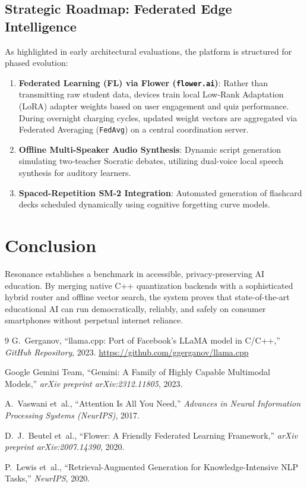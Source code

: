 \documentclass[10.5pt,a4paper]{article}
\begin{document}
\subsection{Strategic Roadmap: Federated Edge Intelligence}
As highlighted in early architectural evaluations, the platform is structured for phased evolution:
\begin{enumerate}[leftmargin=*,itemsep=0.5pt,topsep=1pt]
  \item \textbf{Federated Learning (FL) via Flower (\texttt{flower.ai})}: Rather than transmitting raw student data, devices train local Low-Rank Adaptation (LoRA) adapter weights based on user engagement and quiz performance. During overnight charging cycles, updated weight vectors are aggregated via Federated Averaging (\texttt{FedAvg}) on a central coordination server.
  \item \textbf{Offline Multi-Speaker Audio Synthesis}: Dynamic script generation simulating two-teacher Socratic debates, utilizing dual-voice local speech synthesis for auditory learners.
  \item \textbf{Spaced-Repetition SM-2 Integration}: Automated generation of flashcard decks scheduled dynamically using cognitive forgetting curve models.
\end{enumerate}

\section{Conclusion}
Resonance establishes a benchmark in accessible, privacy-preserving AI education. By merging native C++ quantization backends with a sophisticated hybrid router and offline vector search, the system proves that state-of-the-art educational AI can run democratically, reliably, and safely on consumer smartphones without perpetual internet reliance.

\vspace{0.2cm}

\begin{thebibliography}{9}
\scriptsize
{}
G.~Gerganov, ``llama.cpp: Port of Facebook's LLaMA model in C/C++,'' \textit{GitHub Repository}, 2023. \url{https://github.com/ggerganov/llama.cpp}

Google Gemini Team, ``Gemini: A Family of Highly Capable Multimodal Models,'' \textit{arXiv preprint arXiv:2312.11805}, 2023.

A.~Vaswani et~al., ``Attention Is All You Need,'' \textit{Advances in Neural Information Processing Systems (NeurIPS)}, 2017.

D.~J.~Beutel et~al., ``Flower: A Friendly Federated Learning Framework,'' \textit{arXiv preprint arXiv:2007.14390}, 2020.

P.~Lewis et~al., ``Retrieval-Augmented Generation for Knowledge-Intensive NLP Tasks,'' \textit{NeurIPS}, 2020.
\end{thebibliography}
\end{document}
